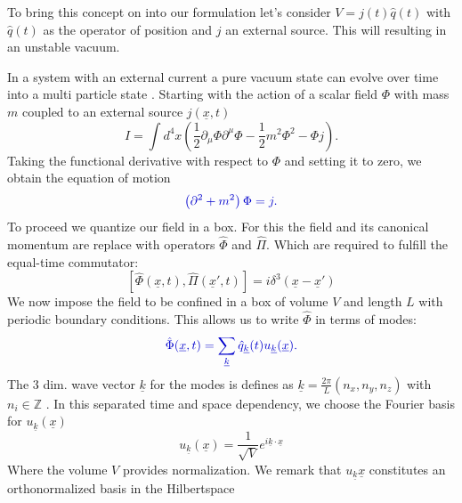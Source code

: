 \documentclass[12pt, titlepage]{article}
\begin{document}
To bring this concept on into our formulation let's consider $ V=j(t)\hat{q}(t) $ with $ \hat{q}(t) $ as the operator of position and $ j $ an external source. This will resulting in an unstable vacuum. 

In a system with an external current a pure vacuum state can evolve over time into a multi particle state .
Starting with the action of a scalar field $ \Phi $ with mass $ m $ coupled to an external source $ j(\underline{x},t) $
\begin{equation}
I=
\int d^{4}x 
\left(
\frac{1}{2}\partial_{\mu}\Phi\partial^{\mu}\Phi
-\frac{1}{2}m^{2}\Phi^{2}
-\Phi j
 \right)
 .
\end{equation}
Taking the functional derivative with respect to $ \Phi $ and setting it to zero, we obtain the equation of motion
\begin{equation}\label{motion_scalar}
\textcolor[RGB]{0,0,204}{
\left(
\partial^{2}+m^{2}
 \right)\Phi
 =j
 .}
\end{equation}
To proceed we quantize our field in a box. For this the field and its canonical momentum are replace with operators $ \hat{\Phi} $ and  $ \hat{\Pi} $. Which are required to fulfill the equal-time commutator:
\begin{equation}
\left[
\hat{\Phi}(\underline{x},t),\hat{\Pi}(\underline{x}',t)
 \right] 
 =
 i
 \delta^{3}
 (\underline{x} - \underline{x}')
\end{equation}
We now impose the field to be confined in a box of volume $ V $ and length $ L $ with periodic boundary conditions.
This allows us to write $ \hat{\Phi} $ in terms of modes:
\begin{equation}\label{box_quanta}
\textcolor[RGB]{0,0,204}{
\hat{\Phi} (\underline{x},t)= \sum_{\underline{k}} \hat{q}_{\underline{k}}(t)u_{\underline{k}}(\underline{x})
 .}
\end{equation}
The 3 dim. wave vector $ \underline{k} $ for the modes is defines as $ \underline{k} = \frac{2\pi}{L}(n_{x},n_{y},n_{z}) $ with $ n_{i}\in \mathbb{Z} $ . 
	In this separated time and space dependency, we choose the Fourier basis for $ u_{\underline{k}}(\underline{x}) $
\begin{equation}\label{fourierbasis}
u_{\underline{k}}(\underline{x})
=
\dfrac{1}{\sqrt{V}} e^{i\underline{k}\cdot \underline{x}}
\end{equation}
Where the volume $ V $ provides normalization. We remark that $ u_{\underline{k}}\underline{x} $ constitutes an orthonormalized basis in the Hilbertspace
\end{document}
